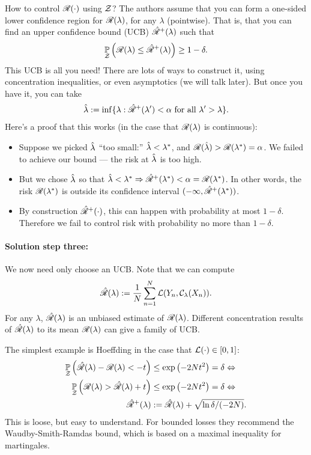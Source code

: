 \documentclass[twoside,11pt]{article}
\numberwithin{equation}{section}
\begin{document}
How to control $\mathscr{R}(\cdot)$ using $\mathcal{Z}$? The authors assume that you can
form a one-sided lower confidence region for $\mathscr{R}(\lambda)$, for any $\lambda$
(pointwise).  That is, that you can find an upper confidence bound (UCB)
$\hat{\mathscr{R}}^{+}(\lambda)$ such that
%
\begin{align*}
%
\p{\calset}{\risk(\lambda) \le \rupper(\lambda)} \ge 1 - \delta.
%
\end{align*}
%
This UCB is all you need!  There are lots of ways to construct it, using
concentration inequalities, or even asymptotics (we will talk later).  But once
you have it, you can take
%
\begin{align*}
%
\lambdahat := \inf\{\lambda: \rupper(\lambda') < \alpha
\textrm{ for all }\lambda' > \lambda \}.
%
\end{align*}
%
Here's a proof that this works (in the case that $\mathscr{R}(\lambda)$
is continuous):
%
\begin{itemize}
    \item Suppose we picked $\hat{\lambda}$ ``too small:'' $\hat{\lambda} <
    \lambda^{*}$, and $\mathscr{R}(\hat{\lambda}) > \mathscr{R}(\lambda^{*}) = \alpha$.  We
    failed to achieve our bound --- the risk at $\hat{\lambda}$ is too high.
    \item But we chose $\hat{\lambda}$ so that $\hat{\lambda} < \lambda^{*}
    \Rightarrow \hat{\mathscr{R}}^{+}(\lambda^{*}) < \alpha = \mathscr{R}(\lambda^{*})$. In other
    words, the risk $\mathscr{R}(\lambda^{*})$ is outside its confidence interval
    $(-\infty, \hat{\mathscr{R}}^{+}(\lambda^{*}))$.
    \item By construction $\hat{\mathscr{R}}^{+}(\cdot)$, this can happen with
    probability at most $1 - \delta$.  Therefore we fail to control
    risk with probability no more than $1-\delta$.
\end{itemize}


\paragraph{Solution step three: }
We now need only choose an UCB.  Note that we can compute
%
\begin{align*}
%
\riskhat(\lambda) := \meann \loss(\y_n, \cfun_\lambda(\x_n)).
%
\end{align*}
%
For any $\lambda$, $\hat{\mathscr{R}}(\lambda)$ is an unbiased estimate of
$\mathscr{R}(\lambda)$.  Different concentration results of $\hat{\mathscr{R}}(\lambda)$ to its
mean $\mathscr{R}(\lambda)$ can give a family of UCB.

The simplest example is Hoeffding in the case that $\mathcal{L}(\cdot) \in [0,1]$:
%
\begin{align*}
%
\p{\calset}{\riskhat(\lambda) - \risk(\lambda) < -t} &\le
\exp\left(-2\n t^2 \right) = \delta \Leftrightarrow \\
\p{\calset}{\risk(\lambda) > \riskhat(\lambda) + t} &\le
\exp\left(-2\n t^2 \right) = \delta \Leftrightarrow \\
\rupper(\lambda) &:= \riskhat(\lambda) + \sqrt{\ln \delta / (-2 \n)}.
%
\end{align*}
%
This is loose, but easy to understand.  For bounded losses
they recommend the Waudby-Smith-Ramdas bound, which is based 
on a maximal inequality for martingales.
\end{document}
